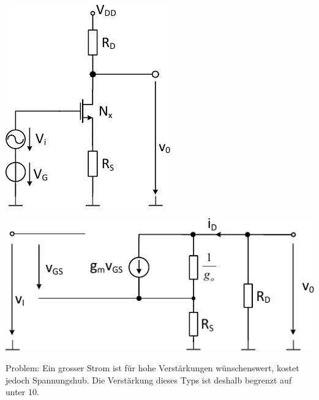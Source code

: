 \begin{minipage}[t]{0.3\columnwidth}
    \includegraphics[width=\columnwidth, align=t]{images/07_verstaerker_mit_widerstandslast_schaltung.pdf}
\end{minipage}
\hfill
\begin{minipage}[t]{0.66\columnwidth}

    \begin{center}
        \includegraphics[width=0.85\columnwidth, align=t]{images/07_verstaerker_mit_widerstandslast_kleinsignalersatzschaltung.pdf}
    \end{center}
    
    Problem: Ein grosser Strom ist für hohe Verstärkungen wünschenswert, kostet jedoch Spannungshub.
    Die Verstärkung dieses Typs ist deshalb begrenzt auf unter 10.
\end{minipage}


